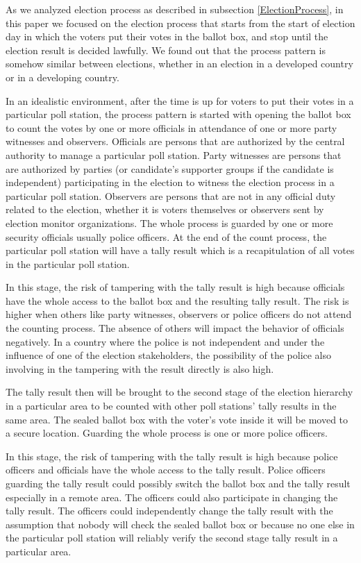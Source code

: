 \documentclass[JIP]{ipsj}
\begin{document}
As we analyzed election process as described in subsection \ref{ElectionProcess}, in this paper we focused on the election process that starts from the start of election day in which the voters put their votes in the ballot box, and stop until the election result is decided lawfully. We found out that the process pattern is somehow similar between elections, whether in an election in a developed country or in a developing country.

In an idealistic environment, after the time is up for voters to put their votes in a particular poll station, the process pattern is started with opening the ballot box to count the votes by one or more officials in attendance of one or more party witnesses and observers. Officials are persons that are authorized by the central authority to manage a particular poll station. Party witnesses are persons that are authorized by parties (or candidate's supporter groups if the candidate is independent) participating in the election to witness the election process in a particular poll station. Observers are persons that are not in any official duty related to the election, whether it is voters themselves or observers sent by election monitor organizations. The whole process is guarded by one or more security officials usually police officers. At the end of the count process, the particular poll station will have a tally result which is a recapitulation of all votes in the particular poll station.

In this stage, the risk of tampering with the tally result is high because officials have the whole access to the ballot box and the resulting tally result. The risk is higher when others like party witnesses, observers or police officers do not attend the counting process. The absence of others will impact the behavior of officials negatively. In a country where the police is not independent and under the influence of one of the election stakeholders, the possibility of the police also involving in the tampering with the result directly is also high.

The tally result then will be brought to the second stage of the election hierarchy in a particular area to be counted with other poll stations' tally results in the same area. The sealed ballot box with the voter's vote inside it will be moved to a secure location. Guarding the whole process is one or more police officers.

In this stage, the risk of tampering with the tally result is high because police officers and officials have the whole access to the tally result. Police officers guarding the tally result could possibly switch the ballot box and the tally result especially in a remote area. The officers could also participate in changing the tally result. The officers could independently change the tally result with the assumption that nobody will check the sealed ballot box or because no one else in the particular poll station will reliably verify the second stage tally result in a particular area.
\end{document}
